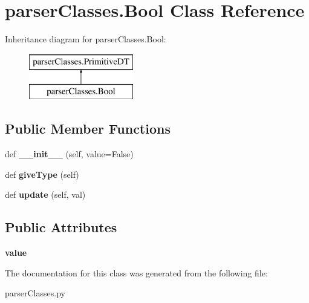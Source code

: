 \hypertarget{classparser_classes_1_1_bool}{}\section{parser\+Classes.\+Bool Class Reference}
\label{classparser_classes_1_1_bool}
Inheritance diagram for parser\+Classes.\+Bool\+:\begin{figure}[H]
\begin{center}
\leavevmode
\includegraphics[height=2.000000cm]{classparser_classes_1_1_bool}
\end{center}
\end{figure}
\subsection*{Public Member Functions}
\begin{DoxyCompactItemize}
\item 
\mbox{\label{classparser_classes_1_1_bool_aea596343fcf5032e9d9900cbe01402a5}} 
def {\bfseries \+\_\+\+\_\+init\+\_\+\+\_\+} (self, value=False)
\item 
\mbox{\label{classparser_classes_1_1_bool_a75f6909f270b96cceb0ff893d28e83c1}} 
def {\bfseries give\+Type} (self)
\item 
\mbox{\label{classparser_classes_1_1_bool_a0d8251d04d4402acc11de38fe599fb12}} 
def {\bfseries update} (self, val)
\end{DoxyCompactItemize}
\subsection*{Public Attributes}
\begin{DoxyCompactItemize}
\item 
\mbox{\label{classparser_classes_1_1_bool_ab05879f8663a2e6ecb4a2dec445cbed0}} 
{\bfseries value}
\end{DoxyCompactItemize}


The documentation for this class was generated from the following file\+:\begin{DoxyCompactItemize}
\item 
parser\+Classes.\+py\end{DoxyCompactItemize}
